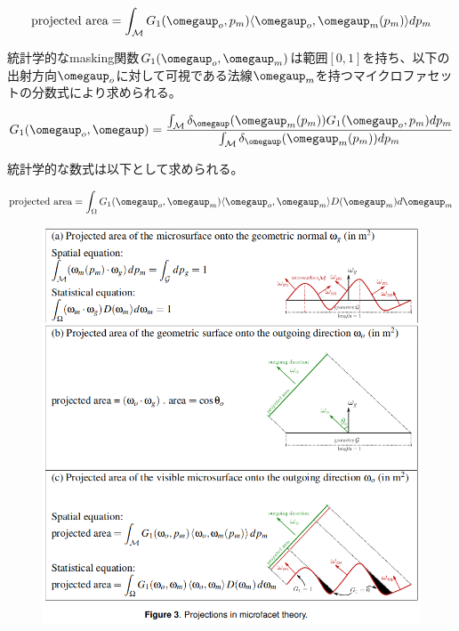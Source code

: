 \documentclass[a4j,xelatex,ja=standard]{bxjsarticle}
\begin{document}
\begin{equation}
    \text{projected area} = \int_\mathcal{M} G_1(\boldsymbol{\omegaup}_o, p_m) \langle \boldsymbol{\omegaup}_o, \boldsymbol{\omegaup}_m(p_m) \rangle dp_m
    \label{eq:11}
\end{equation}

統計学的なmasking関数$G_1(\boldsymbol{\omegaup}_o, \boldsymbol{\omegaup}_m)$は範囲$[0, 1]$を持ち、以下の出射方向$\boldsymbol{\omegaup}_o$に対して可視である法線$\boldsymbol{\omegaup}_m$を持つマイクロファセットの分数式により求められる。

\begin{equation}
    G_1(\boldsymbol{\omegaup}_o, \boldsymbol{\omegaup}) = \frac{\int_\mathcal{M}\delta_{\boldsymbol{\omegaup}}(\boldsymbol{\omegaup}_m(p_m))G_1(\boldsymbol{\omegaup}_o, p_m)dp_m}{\int_\mathcal{M}\delta_{\boldsymbol{\omegaup}}(\boldsymbol{\omegaup}_m(p_m))dp_m}
    \label{eq:12}
\end{equation}

統計学的な数式は以下として求められる。

\begin{equation}
    \text{projected area} = \int_\Omega G_1(\boldsymbol{\omegaup}_o, \boldsymbol{\omegaup}_m) \langle \boldsymbol{\omegaup}_o, \boldsymbol{\omegaup}_m \rangle D(\boldsymbol{\omegaup}_m) d\boldsymbol{\omegaup}_m
    \label{eq:13}
\end{equation}

\begin{figure}
    \includegraphics[width=\textwidth]{Figure3.png}
    \caption{}
    \label{fig:3}
\end{figure}
\end{document}
